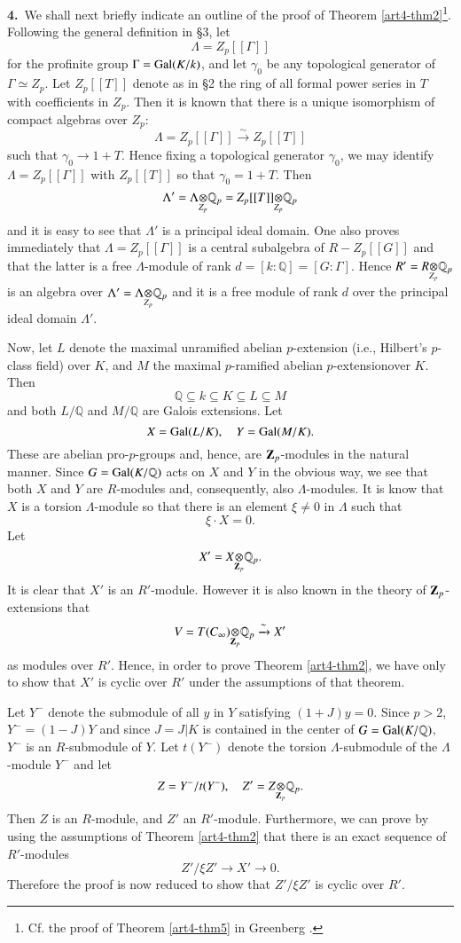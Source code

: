 \medskip
{\bf 4.}~We shall next briefly indicate an outline of the proof of Theorem \ref{art4-thm2}\footnote[8]{Cf. the proof of Theorem \ref{art4-thm5} in Greenberg \cite{art4-key2}.}. Following the general definition in \S3, let
$$
\Lambda = Z_{p}[[\Gamma]]
$$
for the profinite group $\Gamma=\operatorname{Gal}(K/k)$, and let $\gamma_{0}$ be any topological generator of $\Gamma\simeq Z_{p}$. Let $Z_{p}[[T]]$ denote as in \S2 the ring of all formal power series in $T$ with coefficients in $Z_{p}$. Then it is known that there is a unique isomorphism of compact algebras over $Z_{p}$:
$$
\Lambda = Z_{p}[[\Gamma]]\xrightarrow{\sim}Z_{p}[[T]]
$$  
such that $\gamma_{0}\to 1+T$. Hence fixing a topological generator $\gamma_{0}$, we may identify $\Lambda=Z_{p}[[\Gamma]]$ with $Z_{p}[[T]]$ so that $\gamma_{0}=1+T$. Then 
$$
\Lambda'=\foprod{\Lambda}{\mathbb{Q}_{p}}{Z_{p}}=\foprod{Z_{p}[[T]]}{\mathbb{Q}_{p}}{Z_{p}}
$$
and it is easy to see that $\Lambda'$ is a principal ideal domain. One also proves immediately that $\Lambda=Z_{p}[[\Gamma]]$ is a central subalgebra of $R-Z_{p}[[G]]$ and that the latter is a free $\Lambda$-module of rank $d=[k:\mathbb{Q}]=[G:\Gamma]$. Hence $R'=\foprod{R}{\mathbb{Q}_{p}}{Z_{p}}$ is an algebra over $\Lambda'=\foprod{\Lambda}{\mathbb{Q}_{p}}{Z_{p}}$ and it is a free module of rank $d$ over the principal ideal domain $\Lambda'$.

Now, let $L$ denote the maximal unramified abelian $p$-extension (i.e., Hilbert's $p$-class field) over $K$, and $M$ the maximal $p$-ramified abelian $p$-extension\pageoriginale over $K$. Then
$$
\mathbb{Q}\subseteq k\subseteq K\subseteq L\subseteq M
$$
and both $L/\mathbb{Q}$ and $M/\mathbb{Q}$ are Galois extensions. Let
$$
X=\operatorname{Gal}(L/K),\quad Y=\operatorname{Gal}(M/K).
$$
These are abelian pro-$p$-groups and, hence, are $\mathbf{Z}_{p}$-modules in the natural manner. Since $G=\operatorname{Gal}(K/\mathbb{Q})$ acts on $X$ and $Y$ in the obvious way, we see that both $X$ and $Y$ are $R$-modules and, consequently, also $\Lambda$-modules. It is know that $X$ is a torsion $\Lambda$-module so that there is an element $\xi\neq 0$ in $\Lambda$ such that
$$
\xi\cdot X=0.
$$
Let
$$
X'=\foprod{X}{\mathbb{Q}_{p}}{\bZ_{p}}.
$$
It is clear that $X'$ is an $R'$-module. However it is also known in the theory of $\mathbf{Z}_{p}$-extensions that
$$
V=\foprod{T(C_{\infty})}{\mathbb{Q}_{p}}{\bZ_{p}}\xrightarrow{\sim}X'
$$
as modules over $R'$. Hence, in order to prove Theorem \ref{art4-thm2}, we have only to show that $X'$ is cyclic over $R'$ under the assumptions of that theorem.

Let $Y^{-}$ denote the submodule of all $y$ in $Y$ satisfying $(1+J)y=0$. Since $p>2$, $Y^{-}=(1-J)Y$ and since $J=J|K$ is contained in the center of $G=\operatorname{Gal}(K/\mathbb{Q})$, $Y^{-}$ is an $R$-submodule of $Y$. Let $t(Y^{-})$ denote the torsion $\Lambda$-submodule of the $\Lambda$-module $Y^{-}$ and let
$$
Z=Y^{-}/t(Y^{-}),\quad Z'=\foprod{Z}{\mathbb{Q}_{p}}{\bZ_{p}}.
$$
Then $Z$ is an $R$-module, and $Z'$ an $R'$-module. Furthermore, we can prove by using the assumptions of Theorem \ref{art4-thm2} that there is an exact sequence of $R'$-modules
$$
Z'/\xi Z'\to X'\to 0.
$$
Therefore the proof is now reduced to show that $Z'/\xi Z'$ is cyclic over $R'$.

